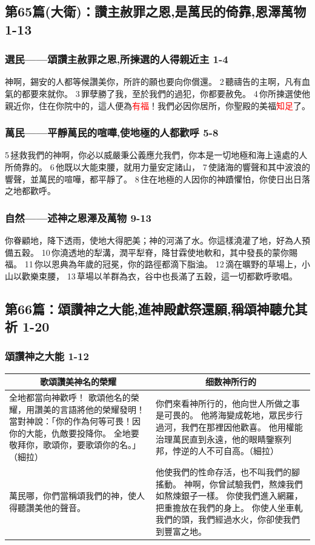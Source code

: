 \subsection{第65篇(大衛)：讚主赦罪之恩,是萬民的倚靠,恩澤萬物 1-13}
\subsubsection{選民——頌讚主赦罪之恩,所揀選的人得親近主 1-4}
神啊，錫安的人都等候讚美你，所許的願也要向你償還。
2 聽禱告的主啊，凡有血氣的都要來就你。
3 罪孽勝了我，至於我們的過犯，你都要赦免。
4 你所揀選使他親近你，住在你院中的，這人便為\textcolor{red}{有福}！我們必因你居所，你聖殿的美福\textcolor{red}{知足}了。
\subsubsection{萬民——平靜萬民的喧嘩,使地極的人都歡呼 5-8}
5 拯救我們的神啊，你必以威嚴秉公義應允我們，你本是一切地極和海上遠處的人所倚靠的。
6 他既以大能束腰，就用力量安定諸山，
7 使諸海的響聲和其中波浪的響聲，並萬民的喧嘩，都平靜了。
8 住在地極的人因你的神蹟懼怕，你使日出日落之地都歡呼。
\subsubsection{自然——述神之恩澤及萬物 9-13}
你眷顧地，降下透雨，使地大得肥美；神的河滿了水。你這樣澆灌了地，好為人預備五穀。
10 你澆透地的犁溝，潤平犁脊，降甘霖使地軟和，其中發長的蒙你賜福。
11 你以恩典為年歲的冠冕，你的路徑都滴下脂油。
12 滴在曠野的草場上，小山以歡樂束腰，
13 草場以羊群為衣，谷中也長滿了五穀，這一切都歡呼歌唱。

\subsection{第66篇：頌讚神之大能,進神殿獻祭還願,稱頌神聽允其祈 1-20}
\subsubsection{頌讚神之大能 1-12}
\begin{table}[H]
\centering
\begin{tabular}{p{7.05cm}|p{10.5cm}}\hline\hline
\multicolumn{1}{c|}{歌頌讚美神名的榮耀}&\multicolumn{1}{c}{细数神所行的}\\\hline
全地都當向神歡呼！
歌頌他名的榮耀，用讚美的言語將他的榮耀發明！
當對神說：「你的作為何等可畏！因你的大能，仇敵要投降你。
全地要敬拜你，歌頌你，要歌頌你的名。」（細拉）
&你們來看神所行的，他向世人所做之事是可畏的。
他將海變成乾地，眾民步行過河，我們在那裡因他歡喜。
他用權能治理萬民直到永遠，他的眼睛鑒察列邦，悖逆的人不可自高。（細拉）\\\hline
萬民哪，你們當稱頌我們的神，使人得聽讚美他的聲音。
&他使我們的性命存活，也不叫我們的腳搖動。
神啊，你曾試驗我們，熬煉我們如熬煉銀子一樣。
你使我們進入網羅，把重擔放在我們的身上。
你使人坐車軋我們的頭，我們經過水火，你卻使我們到豐富之地。\\\hline
\end{tabular}
\end{table} 

